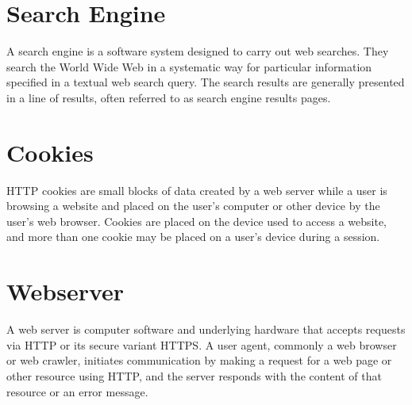 \documentclass[twocolumn, a4paper]{article}
\begin{document}
\section{Search Engine}
A search engine is a software system designed to carry out web searches. They
search the World Wide Web in a systematic way for particular information
specified in a textual web search query. The search results are generally
presented in a line of results, often referred to as search engine results
pages.

\section{Cookies}
HTTP cookies are small blocks of data created by a web server while a user is
browsing a website and placed on the user's computer or other device by the
user's web browser. Cookies are placed on the device used to access a website,
and more than one cookie may be placed on a user's device during a session.

\section{Webserver}
A web server is computer software and underlying hardware that accepts requests
via HTTP or its secure variant HTTPS. A user agent, commonly a web browser or
web crawler, initiates communication by making a request for a web page or
other resource using HTTP, and the server responds with the content of that
resource or an error message.

\begin{table}[ht]
  \caption{Difference between Internet and Intranet}
\end{table}
\end{document}
